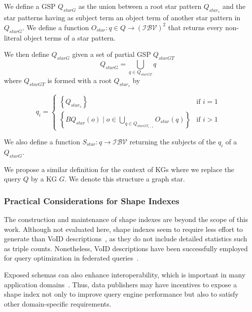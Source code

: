 \begin{definition}\label{def:starPattern}
   
   We define a GSP $Q_{starG}$ as the union between a root star pattern $Q_{star_s}$
   and the star patterns having as subject term an object term of another star pattern in $Q_{starG}$.
   We define a function 
   $O_{star}: q \in Q \rightarrow  (\mathcal{I}\mathcal{B}\mathcal{V})^2$
   that returns every non-literal object terms of a star pattern.

   We then define $Q_{starG}$ given a  set of partial GSP $Q_{starGT}$
   \begin{equation}
      Q_{starG} = \bigcup_{q \in Q_{starGT}} q
   \end{equation}
   where $Q_{starGT}$ is formed with a root $Q_{star_s}$ by

   \begin{equation}
           q_i =
       \begin{cases}
         \left\{ Q_{star_s} \right\} & \text{if } i = 1 \\
           \left\{ BQ_{star}(o) \mid o \in \bigcup_{q \in Q_{starGT_{i-1}}} O_{star}(q) \right\} & \text{if } i>1
       \end{cases}
   \end{equation}

   We also define a function  
   $S_{star}: q \rightarrow  \mathcal{I}\mathcal{B}\mathcal{V}$
   returning the subjects of the $q_i$ of a $Q_{starG}$.

   We propose a similar definition for the context of KGs where we replace the query $Q$ by a KG $G$. 
   We denote this structure a graph star.
   
\end{definition}

\subsubsection{Practical Considerations for Shape Indexes}

The construction and maintenance of shape indexes are beyond the scope of this work. 
Although not evaluated here, shape indexes seem to require less effort to generate than VoID descriptions~\cite{Boehm2011}, as they do not include detailed statistics such as triple counts. 
Nonetheless, VoID descriptions have been successfully employed for query optimization in federated queries~\cite{Montoya2017}. 

Exposed schemas can also enhance interoperability, which is important in many application domains~\cite{rowland2022interoperability, solidSolidApplication, binding2016improving, roller2015benefits}. 
Thus, data publishers may have incentives to expose a shape index not only to improve query engine performance but also to satisfy other domain-specific requirements.

